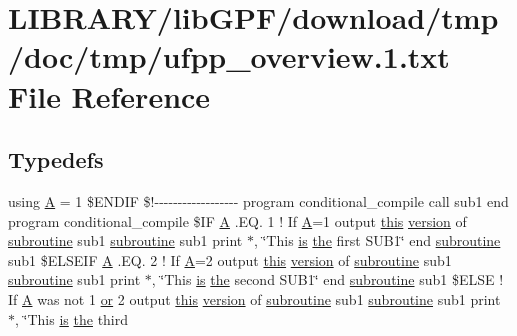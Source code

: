 \hypertarget{ufpp__overview_81_8txt}{}\section{L\+I\+B\+R\+A\+R\+Y/lib\+G\+P\+F/download/tmp/doc/tmp/ufpp\+\_\+overview.1.txt File Reference}
\label{ufpp__overview_81_8txt}
\subsection*{Typedefs}
\begin{DoxyCompactItemize}
\item 
using \hyperlink{ufpp__overview_81_8txt_a316dd9734f0d687136b27cb10311ed5d}{A} = 1 \$E\+N\+D\+IF \$!-\/-\/-\/-\/-\/-\/-\/-\/-\/-\/-\/-\/-\/-\/-\/-\/-\/-\/ program conditional\+\_\+compile call sub1 end program conditional\+\_\+compile \$IF \hyperlink{ufpp__overview_81_8txt_a316dd9734f0d687136b27cb10311ed5d}{A} .E\+Q. 1 ! If \hyperlink{ufpp__overview_81_8txt_a316dd9734f0d687136b27cb10311ed5d}{A}=1 output \hyperlink{M__stopwatch_83_8txt_ad62a52042bb610eee5b36b5516caec22}{this} \hyperlink{inquiry__stopwatch_83_8txt_aee378be19d20935dd436517beda00ee4}{version} of \hyperlink{M__stopwatch_83_8txt_acfbcff50169d691ff02d4a123ed70482}{subroutine} sub1 \hyperlink{M__stopwatch_83_8txt_acfbcff50169d691ff02d4a123ed70482}{subroutine} sub1 print $\ast$, \char`\"{}This \hyperlink{intro__blas1_83_8txt_a42a91df93f840595de3019ceb5d1df23}{is} \hyperlink{M__stopwatch_83_8txt_a0f266597de2e57eb3aa964927bb30e14}{the} first S\+U\+B1\char`\"{} end \hyperlink{M__stopwatch_83_8txt_acfbcff50169d691ff02d4a123ed70482}{subroutine} sub1 \$E\+L\+S\+E\+IF \hyperlink{ufpp__overview_81_8txt_a316dd9734f0d687136b27cb10311ed5d}{A} .E\+Q. 2 ! If \hyperlink{ufpp__overview_81_8txt_a316dd9734f0d687136b27cb10311ed5d}{A}=2 output \hyperlink{M__stopwatch_83_8txt_ad62a52042bb610eee5b36b5516caec22}{this} \hyperlink{inquiry__stopwatch_83_8txt_aee378be19d20935dd436517beda00ee4}{version} of \hyperlink{M__stopwatch_83_8txt_acfbcff50169d691ff02d4a123ed70482}{subroutine} sub1 \hyperlink{M__stopwatch_83_8txt_acfbcff50169d691ff02d4a123ed70482}{subroutine} sub1 print $\ast$, \char`\"{}This \hyperlink{intro__blas1_83_8txt_a42a91df93f840595de3019ceb5d1df23}{is} \hyperlink{M__stopwatch_83_8txt_a0f266597de2e57eb3aa964927bb30e14}{the} second S\+U\+B1\char`\"{} end \hyperlink{M__stopwatch_83_8txt_acfbcff50169d691ff02d4a123ed70482}{subroutine} sub1 \$E\+L\+SE ! If \hyperlink{ufpp__overview_81_8txt_a316dd9734f0d687136b27cb10311ed5d}{A} was not 1 \hyperlink{what__overview_81_8txt_a08ee81dca94cf4ba88d4a64051e232d5}{or} 2 output \hyperlink{M__stopwatch_83_8txt_ad62a52042bb610eee5b36b5516caec22}{this} \hyperlink{inquiry__stopwatch_83_8txt_aee378be19d20935dd436517beda00ee4}{version} of \hyperlink{M__stopwatch_83_8txt_acfbcff50169d691ff02d4a123ed70482}{subroutine} sub1 \hyperlink{M__stopwatch_83_8txt_acfbcff50169d691ff02d4a123ed70482}{subroutine} sub1 print $\ast$, \char`\"{}This \hyperlink{intro__blas1_83_8txt_a42a91df93f840595de3019ceb5d1df23}{is} \hyperlink{M__stopwatch_83_8txt_a0f266597de2e57eb3aa964927bb30e14}{the} third 
\end{DoxyCompactItemize}
